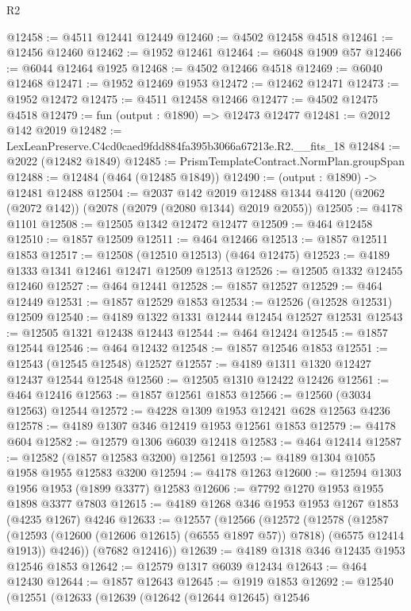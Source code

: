 \begin{lexlean}{R2}
\begin{coremodule}
@12458 := @4511 @12441 @12449
@12460 := @4502 @12458 @4518
@12461 := @12456 @12460
@12462 := @1952 @12461
@12464 := @6048 @1909 @57
@12466 := @6044 @12464 @1925
@12468 := @4502 @12466 @4518
@12469 := @6040 @12468
@12471 := @1952 @12469 @1953
@12472 := @12462 @12471
@12473 := @1952 @12472
@12475 := @4511 @12458 @12466
@12477 := @4502 @12475 @4518
@12479 := fun (output : @1890) => @12473 @12477
@12481 := @2012 @142 @2019
@12482 := LexLeanPreserve.C4cd0caed9fdd884fa395b3066a67213e.R2.__fits_18
@12484 := @2022 (@12482 @1849)
@12485 := PrismTemplateContract.NormPlan.groupSpan
@12488 := @12484 (@464 (@12485 @1849))
@12490 := (output : @1890) -> @12481 @12488
@12504 := @2037
    @142
    @2019
    @12488
    @1344
    @4120
    (@2062 (@2072 @142))
    (@2078 (@2079 (@2080 @1344) @2019 @2055))
@12505 := @4178 @1101
@12508 := @12505 @1342 @12472 @12477
@12509 := @464 @12458
@12510 := @1857 @12509
@12511 := @464 @12466
@12513 := @1857 @12511 @1853
@12517 := @12508 (@12510 @12513) (@464 @12475)
@12523 := @4189 @1333 @1341 @12461 @12471 @12509 @12513
@12526 := @12505 @1332 @12455 @12460
@12527 := @464 @12441
@12528 := @1857 @12527
@12529 := @464 @12449
@12531 := @1857 @12529 @1853
@12534 := @12526 (@12528 @12531) @12509
@12540 := @4189 @1322 @1331 @12444 @12454 @12527 @12531
@12543 := @12505 @1321 @12438 @12443
@12544 := @464 @12424
@12545 := @1857 @12544
@12546 := @464 @12432
@12548 := @1857 @12546 @1853
@12551 := @12543 (@12545 @12548) @12527
@12557 := @4189 @1311 @1320 @12427 @12437 @12544 @12548
@12560 := @12505 @1310 @12422 @12426
@12561 := @464 @12416
@12563 := @1857 @12561 @1853
@12566 := @12560 (@3034 @12563) @12544
@12572 := @4228 @1309 @1953 @12421 @628 @12563 @4236
@12578 := @4189 @1307 @346 @12419 @1953 @12561 @1853
@12579 := @4178 @604
@12582 := @12579 @1306 @6039 @12418
@12583 := @464 @12414
@12587 := @12582 (@1857 @12583 @3200) @12561
@12593 := @4189 @1304 @1055 @1958 @1955 @12583 @3200
@12594 := @4178 @1263
@12600 := @12594 @1303 @1956 @1953 (@1899 @3377) @12583
@12606 := @7792 @1270 @1953 @1955 @1898 @3377 @7803
@12615 := @4189 @1268 @346 @1953 @1953 @1267 @1853 (@4235 @1267) @4246
@12633 := @12557
    (@12566
      (@12572
        (@12578
          (@12587 (@12593 (@12600 (@12606 @12615) (@6555 @1897 @57)) @7818) (@6575 @12414 @1913))
          @4246))
      (@7682 @12416))
@12639 := @4189 @1318 @346 @12435 @1953 @12546 @1853
@12642 := @12579 @1317 @6039 @12434
@12643 := @464 @12430
@12644 := @1857 @12643
@12645 := @1919 @1853
@12692 := @12540
    (@12551
      (@12633
        (@12639
          (@12642
            (@12644 @12645)
            @12546

\end{coremodule}
\end{lexlean}
